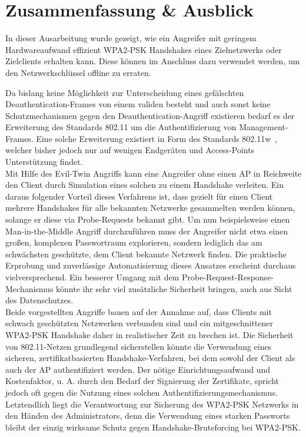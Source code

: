 \section{Zusammenfassung \& Ausblick}
In dieser Ausarbeitung wurde gezeigt, wie ein Angreifer mit geringem Hardwareaufwand effizient WPA2-PSK Handshakes eines Zielnetzwerks oder Zielclients erhalten kann. 
Diese können im Anschluss dazu verwendet werden, um den Netzwerkschlüssel offline zu erraten.

Da bislang keine Möglichkeit zur Unterscheidung eines gefälschten Deauthentication-Frames von einem validen besteht und auch sonst keine Schutzmechanismen gegen den Deauthentication-Angriff existieren bedarf es der Erweiterung des Standards 802.11 um die Authentifizierung von Management-Frames. 
Eine solche Erweiterung existiert in Form des Standards 802.11w~\cite{Ahmad:2011:SPS:1998412.1998424}, welcher bisher jedoch nur auf wenigen Endgeräten und Access-Points Unterstützung findet.\\

Mit Hilfe des Evil-Twin Angriffs kann eine Angreifer ohne einen AP in Reichweite den Client durch Simulation eines solchen zu einem Handshake verleiten.
Ein daraus folgender Vorteil dieses Verfahrens ist, dass gezielt für einen Client mehrere Handshakes für alle bekannten Netzwerke gesammelten werden können, solange er diese via Probe-Requests bekannt gibt.
Um nun beispielsweise einen Man-in-the-Middle Angriff durchzuführen muss der Angreifer nicht etwa einen großen, komplexen Passwortraum explorieren, sondern lediglich das am schwächsten geschützte, dem Client bekannte Netzwerk finden. Die praktische Erprobung und zuverlässige Automatisierung dieses Ansatzes erscheint durchaus vielversprechend.
Ein besserer Umgang mit dem Probe-Request-Response-Mechanismus könnte ihr sehr viel zusätzliche Sicherheit bringen, auch aus Sicht des Datenschutzes.\\

Beide vorgestellten Angriffe bauen auf der Annahme auf, dass Clients mit schwach geschützten Netzwerken verbunden sind und ein mitgeschnittener WPA2-PSK Handshake daher in realistischer Zeit zu brechen ist. Die Sicherheit von 802.11-Netzen grundlegend sicherstellen könnte die Verwendung eines sicheren, zertifikatbasierten Handshake-Verfahren, bei dem sowohl der Client als auch der AP authentifiziert werden.
Der nötige Einrichtungsaufwand und Kostenfaktor, u. A. durch den Bedarf der Signierung der Zertifikate, spricht jedoch oft gegen die Nutzung eines solchen Authentifizierungsmechanismus.
Letztendlich liegt die Verantwortung zur Sicherung des WPA2-PSK Netzwerks in den Händen des Administrators, denn die Verwendung eines starken Passworts bleibt der einzig wirksame Schutz gegen Handshake-Bruteforcing bei WPA2-PSK. 
